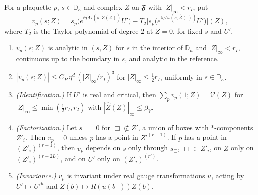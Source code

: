 \begin{definition}\label{def:interaction-pieces}
For a plaquette $p$, $s\in\mathbb D_\kappa$ and complex $Z$ on $\mathfrak F$ with $|Z|_\infty<r_I$, put
\[
v_p(s;Z)=s_p\big(e^{\ii\eta A_*(s;\hat Z(Z))}U'\big)-T_2\big[s_p\big(e^{\ii\eta A_*(s;\hat Z(\cdot))}U'\big)\big](Z),
\]
where $T_2$ is the Taylor polynomial of degree $2$ at $Z=0$, for fixed $s$ and $U'$.
\end{definition}

\begin{proposition}\label{prop:interaction-pieces}
\begin{enumerate}[label=(\alph*)]
\item $v_p(s;Z)$ is analytic in $(s,Z)$ for $s$ in the interior of $\mathbb D_\kappa$ and $|Z|_\infty<r_I$, continuous up to the boundary in $s$, and analytic in the reference.
\item $|v_p(s;Z)|\le C_P\,\eta^d\,(|Z|_\infty/r_I)^3$ for $|Z|_\infty\le\frac12r_I$, uniformly in $s\in\mathbb D_\kappa$.
\item \emph{(Identification.)} If $U'$ is real and critical, then $\sum_pv_p(1;Z)=\mathcal V(Z)$ for $|Z|_\infty\le\min(\frac12r_I,r_2)$ with $|\hat Z(Z)|_\infty\le\beta_V$.
\item \emph{(Factorization.)} Let $s_\Box=0$ for $\Box\not\subset Z'$, a union of boxes with $*$-components $Z'_i$. Then $v_p=0$ unless $p$ has a point in $Z'^{(r+1)}$. If $p$ has a point in $(Z'_i)^{(r+1)}$, then $v_p$ depends on $s$ only through $s_\Box$, $\Box\subset Z'_i$, on $Z$ only on $(Z'_i)^{(r+2L)}$, and on $U'$ only on $(Z'_i)^{(r')}$.
\item \emph{(Invariance.)} $v_p$ is invariant under real gauge transformations $u$, acting by $U'\mapsto U'^u$ and $Z(b)\mapsto R(u(b_-))Z(b)$.
\end{enumerate}
\end{proposition}


